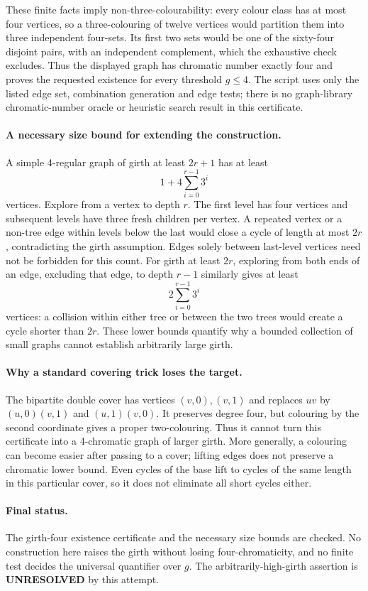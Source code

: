 \documentclass[11pt,a4paper]{article}
\begin{document}
These finite facts imply non-three-colourability: every colour class has at most four vertices, so a three-colouring of twelve vertices would partition them into three independent four-sets. Its first two sets would be one of the sixty-four disjoint pairs, with an independent complement, which the exhaustive check excludes. Thus the displayed graph has chromatic number exactly four and proves the requested existence for every threshold $g\le4$. The script uses only the listed edge set, combination generation and edge tests; there is no graph-library chromatic-number oracle or heuristic search result in this certificate.

\paragraph{A necessary size bound for extending the construction.}
A simple 4-regular graph of girth at least $2r+1$ has at least
\[
 1+4\sum_{i=0}^{r-1}3^i
\]
vertices. Explore from a vertex to depth $r$. The first level has four vertices and subsequent levels have three fresh children per vertex. A repeated vertex or a non-tree edge within levels below the last would close a cycle of length at most $2r$, contradicting the girth assumption. Edges solely between last-level vertices need not be forbidden for this count. For girth at least $2r$, exploring from both ends of an edge, excluding that edge, to depth $r-1$ similarly gives at least
\[
 2\sum_{i=0}^{r-1}3^i
\]
vertices: a collision within either tree or between the two trees would create a cycle shorter than $2r$. These lower bounds quantify why a bounded collection of small graphs cannot establish arbitrarily large girth.

\paragraph{Why a standard covering trick loses the target.}
The bipartite double cover has vertices $(v,0),(v,1)$ and replaces $uv$ by $(u,0)(v,1)$ and $(u,1)(v,0)$. It preserves degree four, but colouring by the second coordinate gives a proper two-colouring. Thus it cannot turn this certificate into a 4-chromatic graph of larger girth. More generally, a colouring can become easier after passing to a cover; lifting edges does not preserve a chromatic lower bound. Even cycles of the base lift to cycles of the same length in this particular cover, so it does not eliminate all short cycles either.

\paragraph{Final status.}
The girth-four existence certificate and the necessary size bounds are checked. No construction here raises the girth without losing four-chromaticity, and no finite test decides the universal quantifier over $g$. The arbitrarily-high-girth assertion is \textbf{UNRESOLVED} by this attempt.
\end{document}
